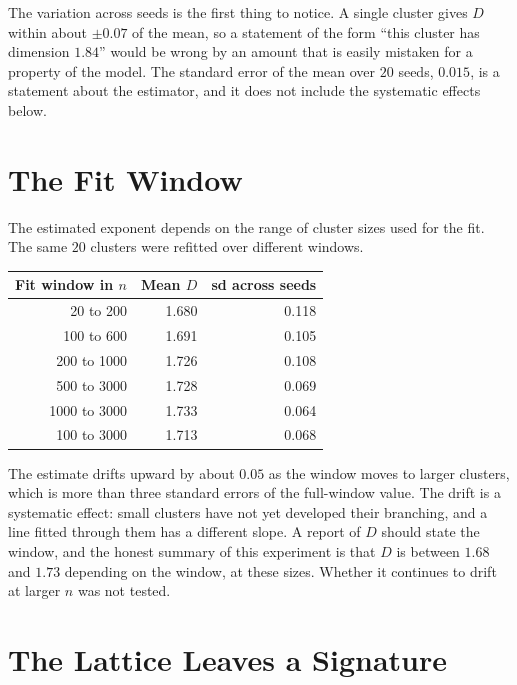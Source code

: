 The variation across seeds is the first thing to notice. A single cluster gives $D$ within about $\pm0.07$ of the mean, so a statement of the form ``this cluster has dimension $1.84$'' would be wrong by an amount that is easily mistaken for a property of the model. The standard error of the mean over $20$ seeds, $0.015$, is a statement about the estimator, and it does not include the systematic effects below.

\section{The Fit Window}

The estimated exponent depends on the range of cluster sizes used for the fit. The same $20$ clusters were refitted over different windows.

\begin{center}
\begin{tabular}{rrr}
\toprule
Fit window in $n$ & Mean $D$ & sd across seeds\\
\midrule
20 to 200 & 1.680 & 0.118\\
100 to 600 & 1.691 & 0.105\\
200 to 1000 & 1.726 & 0.108\\
500 to 3000 & 1.728 & 0.069\\
1000 to 3000 & 1.733 & 0.064\\
100 to 3000 & 1.713 & 0.068\\
\bottomrule
\end{tabular}
\end{center}

The estimate drifts upward by about $0.05$ as the window moves to larger clusters, which is more than three standard errors of the full-window value. The drift is a systematic effect: small clusters have not yet developed their branching, and a line fitted through them has a different slope. A report of $D$ should state the window, and the honest summary of this experiment is that $D$ is between $1.68$ and $1.73$ depending on the window, at these sizes. Whether it continues to drift at larger $n$ was not tested.

\section{The Lattice Leaves a Signature}


